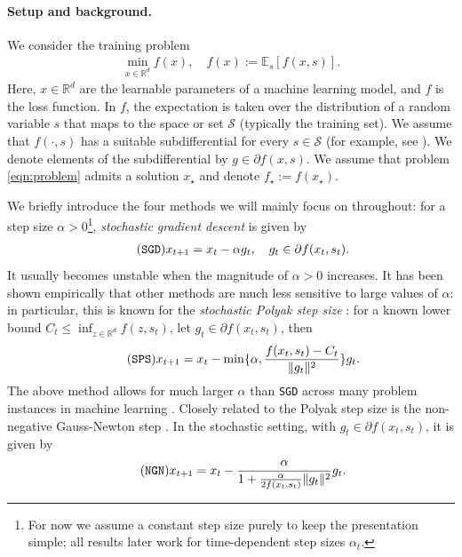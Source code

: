 \documentclass{article}
\newcommand{\R}{\mathbb{R}}
\newcommand{\E}{\mathbb{E}}
\newcommand{\SGD}{{\texttt{SGD}}}
\newcommand{\SPS}{{\texttt{SPS}}}
\newcommand{\NGN}{{\texttt{NGN}}}
\theoremstyle{plain}
\theoremstyle{definition}
\theoremstyle{remark}
\begin{document}
%
\paragraph{Setup and background.}
%
We consider the training problem
\begin{align}\label{eqn:problem}
    \min_{x\in \R^d} f(x), \quad f(x) :=  \E_{s}[f(x,s)].
\end{align}
Here, $x \in \R^d$ are the learnable parameters of a machine learning model, and $f$ is the loss function. In $f$, the expectation is taken over the distribution of a random variable $s$ that maps to the space or set $\mathcal{S}$ (typically the training set).
We assume that $f(\cdot,s)$ has a suitable subdifferential for every $s\in \mathcal{S}$ (for example, see \citet{Rockafellar1970,Clarke1983,Bolte2021}). We denote elements of the subdifferential by $g\in \partial f(x,s)$. We assume that problem \eqref{eqn:problem} admits a solution $x_\star$ and denote $f_\star := f(x_\star)$.

We briefly introduce the four methods we will mainly focus on throughout: for a step size $\alpha>0$\footnote{For now we assume a constant step size purely to keep the presentation simple; all results later work for time-dependent step sizes $\alpha_t$.}, \emph{stochastic gradient descent} is given by
\begin{align}\label{eqn:sgd}\tag{\SGD{}}
    x_{t+1} = x_t - \alpha g_t, \quad g_t \in \partial f(x_t, s_t).
\end{align}
It usually becomes unstable when the magnitude of $\alpha > 0$ increases.
It has been shown empirically that other methods are much less sensitive to large values of $\alpha$: in particular, this is known for the \emph{stochastic Polyak step size} \citep{Polyak1987,Asi2019,Loizou2021}: for a known lower bound $C_t \leq \inf_{z\in \R^d} f(z, s_t)$, let $g_t \in \partial f(x_t, s_t)$, then
\begin{align}
    \label{eqn:sps}\tag{\SPS{}}
    x_{t+1} = x_t - \min\{\alpha, \frac{f(x_t,s_t) - C_t}{\|g_t\|^2} \} g_t.
\end{align}
The above method allows for much larger $\alpha$ than \SGD{} across many problem instances in machine learning \citep{Schaipp2023,Schaipp2024a}.
%
Closely related to the Polyak step size is the non-negative Gauss-Newton step \citep{Orvieto2024}. In the stochastic setting, with $g_t \in \partial f(x_t, s_t)$, it is given by
\begin{align}
    \label{eqn:ngn}\tag{\NGN{}}
    x_{t+1} = x_t - \frac{\alpha}{1+\frac{\alpha}{2f(x_t,s_t)}\|g_t\|^2}g_t.
\end{align}
\end{document}
